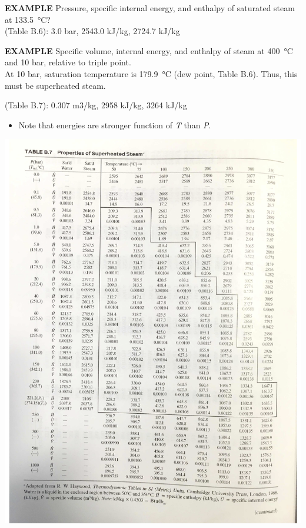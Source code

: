 \documentclass[11pt]{article}
\begin{document}
\begin{framed}
\noindent \textbf{EXAMPLE} Pressure, specific internal energy, and enthalpy of saturated steam at \SI{133.5}{\celsius}?
\\
\noindent (Table B.6): 3.0 bar, 2543.0 kJ/kg, 2724.7 kJ/kg
\end{framed}


\begin{framed}
\noindent \textbf{EXAMPLE} Specific volume, internal energy, and enthalpy of steam at \SI{400}{\celsius} and 10 bar, relative to triple point.
\\
\noindent At 10 bar, saturation temperature is \SI{179.9}{\celsius} (dew point, Table B.6).  Thus, this must be superheated steam.

(Table B.7): 0.307 m3/kg, 2958 kJ/kg, 3264 kJ/kg
\end{framed}

\begin{itemize}
\item Note that energies are stronger function of \emph{T} than \emph{P}.
\end{itemize}

\includegraphics[width=.9\linewidth]{./figs/TableB7.png}
\end{document}
